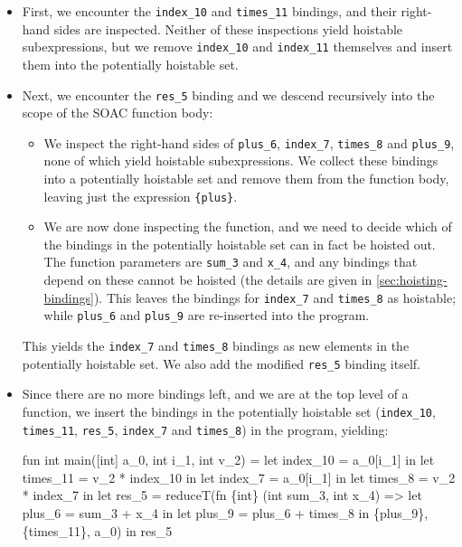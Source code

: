 \begin{itemize}
\item First, we encounter the \texttt{index\_10} and
  \texttt{times\_11} bindings, and their right-hand sides are
  inspected.  Neither of these inspections yield hoistable
  subexpressions, but we remove \texttt{index\_10} and
  \texttt{index\_11} themselves and insert them into the potentially
  hoistable set.

\item Next, we encounter the \texttt{res\_5} binding and we descend
  recursively into the scope of the SOAC function body:

  \begin{itemize}
  \item We inspect the right-hand sides of \texttt{plus\_6},
    \texttt{index\_7}, \texttt{times\_8} and \texttt{plus\_9}, none of
    which yield hoistable subexpressions.  We collect these bindings
    into a potentially hoistable set and remove them from the function
    body, leaving just the expression \texttt{\{plus\}}.

  \item We are now done inspecting the function, and we need to decide
    which of the bindings in the potentially hoistable set can in fact
    be hoisted out.  The function parameters are \texttt{sum\_3} and
    \texttt{x\_4}, and any bindings that depend on these cannot be
    hoisted (the details are given in \cref{sec:hoisting-bindings}).
    This leaves the bindings for \texttt{index\_7} and
    \texttt{times\_8} as hoistable; while \texttt{plus\_6} and
    \texttt{plus\_9} are re-inserted into the program.
  \end{itemize}

  This yields the \texttt{index\_7} and \texttt{times\_8} bindings as
  new elements in the potentially hoistable set.  We also add the
  modified \texttt{res\_5} binding itself.

\item Since there are no more bindings left, and we are at the top
  level of a function, we insert the bindings in the potentially
  hoistable set (\texttt{index\_10}, \texttt{times\_11},
  \texttt{res\_5}, \texttt{index\_7} and \texttt{times\_8}) in the
  program, yielding:

\begin{colorcode}
fun int main([int] a_0, int i_1, int v_2) =
  let index_10 = a_0[i_1] in
  let times_11 = v_2 * index_10 in
  let index_7 = a_0[i_1] in
  let times_8 = v_2 * index_7 in
  let {res_5} =
    reduceT(fn \{int\} (int sum_3, int x_4) =>
              let plus_6 = sum_3 + x_4 in
              let plus_9 = plus_6 + times_8 in
              \{plus_9\},
            \{times_11\}, a_0) in
  res_5
\end{colorcode}
\end{itemize}

